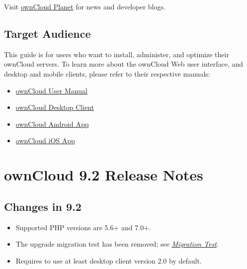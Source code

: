 \documentclass[letterpaper,10pt,english]{sphinxmanual}
\begin{document}
Visit \href{https://owncloud.org/news/}{ownCloud Planet} for news and developer
blogs.


\section{Target Audience}
\label{index:target-audience}
This guide is for users who want to install, administer, and
optimize their ownCloud servers. To learn more about the ownCloud Web
user interface, and desktop and mobile clients, please refer to their
respective manuals:
\begin{itemize}
\item {} 
\href{https://doc.owncloud.org/server/9.0/user\_manual/}{ownCloud User Manual}

\item {} 
\href{https://doc.owncloud.org/desktop/2.1/}{ownCloud Desktop Client}

\item {} 
\href{https://doc.owncloud.org/android/}{ownCloud Android App}

\item {} 
\href{https://doc.owncloud.org/ios/}{ownCloud iOS App}

\end{itemize}


\chapter{ownCloud 9.2 Release Notes}
\label{release_notes::doc}\label{release_notes:owncloud-ios-app}\label{release_notes:owncloud-version-release-notes}

\section{Changes in 9.2}
\label{release_notes:changes-in-9-2}\begin{itemize}
\item {} 
Supported PHP versions are 5.6+ and 7.0+.

\item {} 
The upgrade migration test has been removed; see {\hyperref[maintenance/upgrade:migration\string-test\string-label]{\emph{Migration Test}}}.

\item {} 
Requires to use at least desktop client version 2.0 by default.

\end{itemize}
\end{document}
